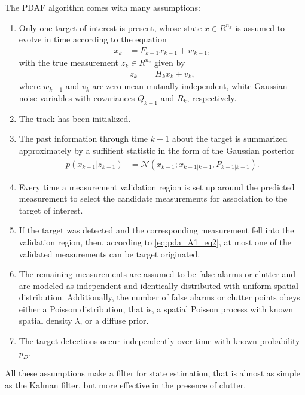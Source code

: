 The PDAF algorithm comes with many assumptions:
\begin{enumerate}
    \item Only one target of interest is present, whose state $x \in R^{n_x}$ is assumed to evolve in time according to the equation
        \begin{align}
            x_k &= F_{k-1} x_{k-1} + w_{k-1},
        \end{align}
        with the true measurement $z_k \in R^{n_z}$ given by
        \begin{align}
            \label{eq:pda_A1_eq2}
            z_k &= H_k x_k + v_k,
        \end{align}
        where $w_{k-1}$ and $v_k$ are zero mean mutually independent, white Gaussian noise variables with covariances $Q_{k-1}$ and $R_k$, respectively.
    \item The track has been initialized.
    \item The past information through time $k-1$ about the target is summarized approximately by a suffifient statistic in the form of the Gaussian posterior
        \begin{align}
            p(x_{k-1}|z_{k-1}) &= \mathcal{N}(x_{k-1}; x_{k-1|k-1}, P_{k-1|k-1}). \label{eq:pda_A3}
        \end{align}
    \item Every time a measurement validation region is set up around the predicted measurement to select the candidate measurements for association to the target of interest.
    \item If the target was detected and the corresponding
    measurement fell into the validation region, then,
    according to \eqref{eq:pda_A1_eq2}, at most one of the validated measurements can be target originated.
    \item The remaining measurements are assumed to be false alarms or clutter and are modeled as independent and identically distributed with uniform spatial distribution. Additionally, the number of false alarms or clutter points obeys either a Poisson distribution, that is, a spatial Poisson process with known
    spatial density $\lambda$, or a diffuse prior.
    \item The target detections occur independently over time
    with known probability $p_D$.
\end{enumerate}
All these assumptions make a filter for state estimation, that is almost as simple as the Kalman filter, but more effective in the presence of clutter.


